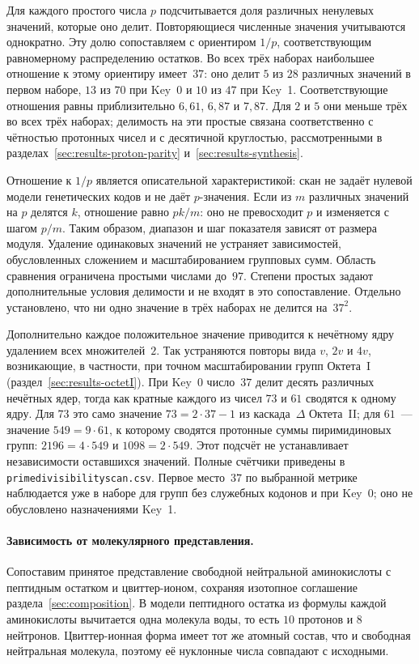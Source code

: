 \documentclass[11pt,a4paper]{article}
\renewcommand{\_}{\origunderscore\allowbreak}
\begin{document}
Для каждого простого числа $p$ подсчитывается доля различных
ненулевых значений, которые оно делит. Повторяющиеся
численные значения учитываются однократно. Эту долю
сопоставляем с ориентиром $1/p$, соответствующим
равномерному распределению остатков. Во всех трёх наборах
наибольшее отношение к этому ориентиру имеет~$37$:
оно делит $5$ из $28$ различных значений в первом наборе,
$13$ из $70$ при Key~0 и $10$ из $47$ при Key~1.
Соответствующие отношения равны приблизительно
$6{,}61$, $6{,}87$ и $7{,}87$.
Для $2$ и $5$ они меньше трёх во всех трёх наборах;
делимость на эти простые связана соответственно
с чётностью протонных чисел и с десятичной круглостью,
рассмотренными в разделах~\ref{sec:results-proton-parity}
и~\ref{sec:results-synthesis}.

Отношение к $1/p$ является описательной характеристикой:
скан не задаёт нулевой модели генетических кодов
и не даёт $p$-значения. Если из $m$ различных значений
на $p$ делятся $k$, отношение равно $pk/m$:
оно не превосходит $p$ и изменяется с шагом $p/m$.
Таким образом, диапазон и шаг показателя зависят
от размера модуля. Удаление одинаковых значений
не устраняет зависимостей, обусловленных сложением
и масштабированием групповых сумм.
Область сравнения ограничена простыми числами до~$97$.
Степени простых задают дополнительные условия делимости
и не входят в это сопоставление. Отдельно установлено,
что ни одно значение в трёх наборах не делится на~$37^2$.

Дополнительно каждое положительное значение приводится
к нечётному ядру удалением всех множителей~$2$.
Так устраняются повторы вида $v$, $2v$ и $4v$,
возникающие, в частности, при точном масштабировании
групп Октета~I (раздел~\ref{sec:results-octetI}).
При Key~0 число~$37$ делит десять различных нечётных
ядер, тогда как кратные каждого из чисел $73$ и $61$
сводятся к одному ядру. Для $73$ это само значение
$73=2\cdot37-1$ из каскада~$\Delta$ Октета~II;
для $61$~--- значение $549=9\cdot61$, к которому
сводятся протонные суммы пиримидиновых групп:
$2196=4\cdot549$ и $1098=2\cdot549$.
Этот подсчёт не устанавливает независимости
оставшихся значений.
Полные счётчики приведены в
\texttt{prime\_divisibility\_scan.csv}.
Первое место~$37$ по выбранной метрике наблюдается уже
в наборе для групп без служебных кодонов и при Key~0;
оно не обусловлено назначениями Key~1.

\paragraph{Зависимость от молекулярного представления.}
Сопоставим принятое представление свободной нейтральной
аминокислоты с пептидным остатком и цвиттер-ионом,
сохраняя изотопное соглашение
раздела~\ref{sec:composition}. В модели пептидного остатка
из формулы каждой аминокислоты вычитается одна молекула
воды, то есть $10$ протонов и $8$ нейтронов.
Цвиттер-ионная форма имеет тот же атомный состав,
что и свободная нейтральная молекула, поэтому её нуклонные
числа совпадают с исходными.
\end{document}
